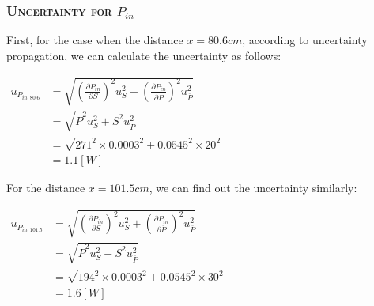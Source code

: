 \documentclass[a4paper,12pt]{article}
\begin{document}
\begin{appendices}
\subsubsection{\textsc{Uncertainty for $P_{in}$}}
First, for the case when the distance $x = 80.6 cm$, according to uncertainty propagation, we can calculate the uncertainty as follows:
\begin{center}
$ \begin{aligned}
\displaystyle u_{P_{in,80.6}} &= \sqrt{(\frac{\partial P_{in}}{\partial S})^2u_S^2 + (\frac{\partial P_{in}}{\partial \overline{P} })^2u_{\overline{P}}^2 } \\
											&= \sqrt{\overline{P}^2 u_{S}^2 + S^2 u_{\overline{P}}^2 } \\
											&= \sqrt{271^2 \times 0.0003^2 + 0.0545^2 \times 20^2} \\
											&= 1.1 [W]
\end{aligned}$
\end{center}
\par For the distance $x = 101.5 cm$, we can find out the uncertainty similarly:
\begin{center}
$ \begin{aligned}
\displaystyle u_{P_{in,101.5}} &= \sqrt{(\frac{\partial P_{in}}{\partial S})^2u_S^2 + (\frac{\partial P_{in}}{\partial \overline{P} })^2u_{\overline{P}}^2 } \\
											&= \sqrt{\overline{P}^2 u_{S}^2 + S^2 u_{\overline{P}}^2 } \\
											&= \sqrt{194^2 \times 0.0003^2 + 0.0545^2 \times 30^2} \\
											&= 1.6 [W]
\end{aligned}$
\end{center}


\end{appendices}
\end{document}

